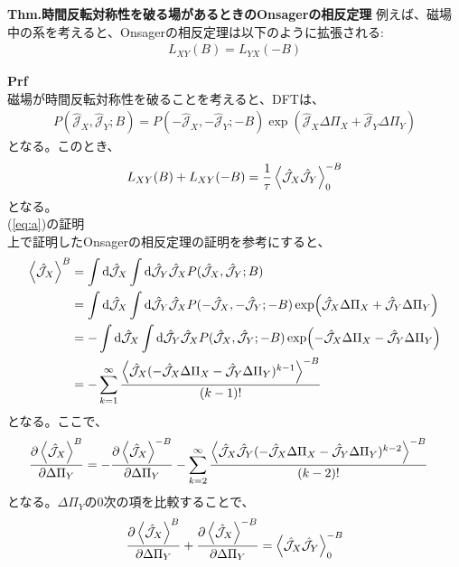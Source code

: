 \documentclass[a4paper,11pt]{jsarticle}
\begin{document}
\begin{itembox}[l]{\textbf{Thm.時間反転対称性を破る場があるときのOnsagerの相反定理}}
    例えば、磁場中の系を考えると、Onsagerの相反定理は以下のように拡張される:
    \begin{align}
        L_{XY} (B) = L_{YX} (-B)
    \end{align}
\end{itembox}
\textbf{Prf}\\
磁場が時間反転対称性を破ることを考えると、DFTは、
\begin{align}
    P(\hat{\mathcal{J}}_X, \hat{\mathcal{J}}_Y;B) = P(-\hat{\mathcal{J}}_X, -\hat{\mathcal{J}}_Y;-B)\exp(\hat{\mathcal{J}}_X \Delta \Pi_X + \hat{\mathcal{J}}_Y \Delta \Pi_Y)
\end{align}
となる。このとき、
\begin{align}
    \label{eq:a}
    L_{XY} (B) + L_{XY} (-B) = \frac{1}{\tau} \ev{\hat{\mathcal{J}}_X \hat{\mathcal{J}}_Y}_0^{-B}
\end{align}
となる。\\
(\ref{eq:a})の証明\\
上で証明したOnsagerの相反定理の証明を参考にすると、
\begin{align}
    \ev{\hat{\mathcal{J}}_X} ^B &= \int \dd \hat{\mathcal{J}}_X \int \dd \hat{\mathcal{J}}_Y \hat{\mathcal{J}}_X P(\hat{\mathcal{J}}_X, \hat{\mathcal{J}}_Y;B)\\
    &= \int \dd \hat{\mathcal{J}}_X \int \dd \hat{\mathcal{J}}_Y \hat{\mathcal{J}}_X P(-\hat{\mathcal{J}}_X, -\hat{\mathcal{J}}_Y;-B)\exp(\hat{\mathcal{J}}_X \Delta \Pi_X + \hat{\mathcal{J}}_Y \Delta \Pi_Y)\\
    &= -\int \dd \hat{\mathcal{J}}_X \int \dd \hat{\mathcal{J}}_Y \hat{\mathcal{J}}_X P(\hat{\mathcal{J}}_X, \hat{\mathcal{J}}_Y;-B)\exp(-\hat{\mathcal{J}}_X \Delta \Pi_X - \hat{\mathcal{J}}_Y \Delta \Pi_Y)\\
    &= -\sum_{k=1}^{\infty} \frac{\ev{\hat{\mathcal{J}}_X(-\hat{\mathcal{J}}_X\Delta \Pi_X-\hat{\mathcal{J}}_Y\Delta \Pi_Y)^{k-1}}^{-B}}{(k-1)!}
\end{align}
となる。ここで、
\begin{align}
    \pdv{\ev{\hat{\mathcal{J}}_X}^B}{\Delta \Pi_Y} &= -\pdv{\ev{\hat{\mathcal{J}}_X}^{-B}}{\Delta \Pi_Y} - \sum_{k=2}^{\infty} \frac{\ev{\hat{\mathcal{J}}_X\hat{\mathcal{J}}_Y(-\hat{\mathcal{J}}_X\Delta \Pi_X-\hat{\mathcal{J}}_Y\Delta \Pi_Y)^{k-2}}^{-B}}{(k-2)!}
\end{align}
となる。$\Delta \Pi_Y$の0次の項を比較することで、
\begin{align}
    \pdv{\ev{\hat{\mathcal{J}}_X}^B}{\Delta \Pi_Y} + \pdv{\ev{\hat{\mathcal{J}}_X}^{-B}}{\Delta \Pi_Y} = \ev{\hat{\mathcal{J}}_X \hat{\mathcal{J}}_Y}_0^{-B}
\end{align}
\end{document}
